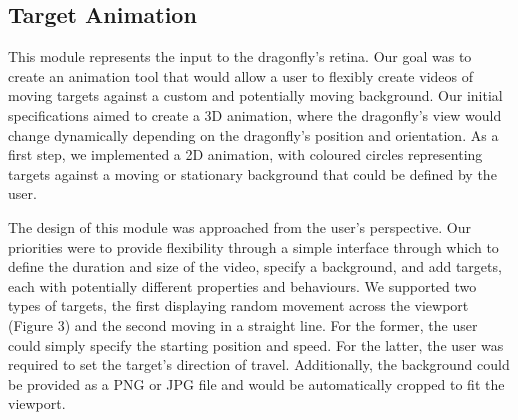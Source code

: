 \documentclass[a4paper,11pt]{article}
\begin{document}
\subsection{Target Animation}
This module represents the input to the dragonfly's retina. Our goal was to create an animation tool that would allow a user to flexibly create videos of moving targets against a custom and potentially moving background. Our initial specifications aimed to create a 3D animation, where the dragonfly's view would change dynamically depending on the dragonfly's position and orientation. As a first step, we implemented a 2D animation, with coloured circles representing targets against a moving or stationary background that could be defined by the user.

The design of this module was approached from the user's perspective. Our priorities were to provide flexibility through a simple interface through which to define the duration and size of the video, specify a background, and add targets, each with potentially different properties and behaviours. We supported two types of targets, the first displaying random movement across the viewport (Figure 3) and the second moving in a straight line. For the former, the user could simply specify the starting position and speed. For the latter, the user was required to set the target's direction of travel. Additionally, the background could be provided as a PNG or JPG file and would be automatically cropped to fit the viewport.
\end{document}
